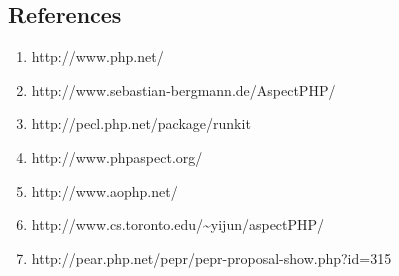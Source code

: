 \documentclass[landscape,a0]{a0poster}
\begin{document}
\begin{poster}
\begin{pcolumn}
\begin{pbox}
\section{References}
\normalsize
\begin{enumerate}
  \item http://www.php.net/
  \item http://www.sebastian-bergmann.de/AspectPHP/
  \item http://pecl.php.net/package/runkit
  \item http://www.phpaspect.org/
  \item http://www.aophp.net/
  \item http://www.cs.toronto.edu/\textasciitilde yijun/aspectPHP/
  \item http://pear.php.net/pepr/pepr-proposal-show.php?id=315
\end{enumerate}
\end{pbox}
\end{pcolumn}
\end{poster}
\end{document}
